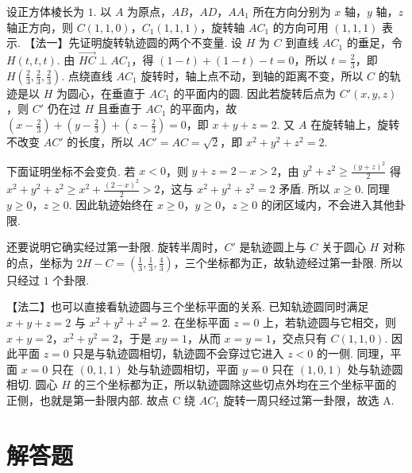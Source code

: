 \documentclass[UTF8,a4paper,oneside,11pt]{ctexbook}
\begin{document}
\begin{solution}
设正方体棱长为 \( 1 \). 以 \(A\) 为原点，\(AB\)，\(AD\)，\(AA_1\) 所在方向分别为 \( x \) 轴，\( y \) 轴，\( z \) 轴正方向，则 \( C\left( 1,1,0 \right) \)，\( C_1\left( 1,1,1 \right) \)，旋转轴 \(AC_1\) 的方向可用 \( \left( 1,1,1 \right) \) 表示.
【法一】先证明旋转轨迹圆的两个不变量. 设 \(H\) 为 \(C\) 到直线 \(AC_1\) 的垂足，令 \( H\left( t,t,t \right) \). 由 \( \overrightarrow{HC}\perp AC_1 \)，得 \( \left( 1-t \right)+\left( 1-t \right)-t=0 \)，所以 \( t=\frac{2}{3} \)，即 \( H\left( \frac{2}{3},\frac{2}{3},\frac{2}{3} \right) \). 点绕直线 \(AC_1\) 旋转时，轴上点不动，到轴的距离不变，所以 \(C\) 的轨迹是以 \(H\) 为圆心，在垂直于 \(AC_1\) 的平面内的圆. 因此若旋转后点为 \( C'\left( x,y,z \right) \)，则 \(C'\) 仍在过 \(H\) 且垂直于 \(AC_1\) 的平面内，故 \( \left( x-\frac{2}{3} \right)+\left( y-\frac{2}{3} \right)+\left( z-\frac{2}{3} \right)=0 \)，即 \( x+y+z=2 \). 又 \(A\) 在旋转轴上，旋转不改变 \(AC'\) 的长度，所以 \( AC'=AC=\sqrt{2} \)，即 \( x^2+y^2+z^2=2 \).

下面证明坐标不会变负. 若 \( x<0 \)，则 \( y+z=2-x>2 \)，由 \( y^2+z^2\ge \frac{\left( y+z \right)^2}{2} \) 得 \( x^2+y^2+z^2\ge x^2+\frac{\left( 2-x \right)^2}{2}>2 \)，这与 \( x^2+y^2+z^2=2 \) 矛盾. 所以 \( x\ge0 \). 同理 \( y\ge0 \)，\( z\ge0 \). 因此轨迹始终在 \( x\ge0 \)，\( y\ge0 \)，\( z\ge0 \) 的闭区域内，不会进入其他卦限.

还要说明它确实经过第一卦限. 旋转半周时，\(C'\) 是轨迹圆上与 \(C\) 关于圆心 \(H\) 对称的点，坐标为 \( 2H-C=\left( \frac{1}{3},\frac{1}{3},\frac{4}{3} \right) \)，三个坐标都为正，故轨迹经过第一卦限. 所以只经过 \( 1 \) 个卦限.

【法二】也可以直接看轨迹圆与三个坐标平面的关系. 已知轨迹圆同时满足 \( x+y+z=2 \) 与 \( x^2+y^2+z^2=2 \). 在坐标平面 \( z=0 \) 上，若轨迹圆与它相交，则 \( x+y=2 \)，\( x^2+y^2=2 \)，于是 \( xy=1 \)，从而 \( x=y=1 \)，交点只有 \( C\left( 1,1,0 \right) \). 因此平面 \( z=0 \) 只是与轨迹圆相切，轨迹圆不会穿过它进入 \( z<0 \) 的一侧. 同理，平面 \( x=0 \) 只在 \( \left( 0,1,1 \right) \) 处与轨迹圆相切，平面 \( y=0 \) 只在 \( \left( 1,0,1 \right) \) 处与轨迹圆相切. 圆心 \(H\) 的三个坐标都为正，所以轨迹圆除这些切点外均在三个坐标平面的正侧，也就是第一卦限内部. 故点 C 绕 \(AC_1\) 旋转一周只经过第一卦限，故选 A.
\end{solution}
\section{解答题}
\end{document}
